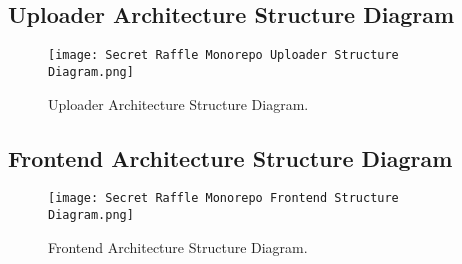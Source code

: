 \documentclass{article}
\begin{document}
\subsection{Uploader Architecture Structure Diagram}
\begin{figure}[h]
  \vspace{0cm}
  \hspace{-3cm}
  \texttt{[image: Secret Raffle Monorepo Uploader Structure Diagram.png]}
  \caption{Uploader Architecture Structure Diagram.}
  \label{fig:Uploader Architecture Structure Diagram Appendix}
\end{figure}

\newpage

\subsection{Frontend Architecture Structure Diagram}
\begin{figure}[h]
  \vspace{0cm}
  \hspace{-3cm}
  \texttt{[image: Secret Raffle Monorepo Frontend Structure Diagram.png]}
  \caption{Frontend Architecture Structure Diagram.}
  \label{fig:Frontend Architecture Structure Diagram Appendix}
\end{figure}
\end{document}
